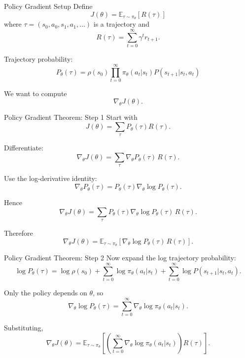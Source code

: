 \documentclass[aspectratio=169]{beamer}
\begin{document}
\begin{frame}{Policy Gradient Setup}
  Define
  \[
  J(\theta)=\mathbb{E}_{\tau\sim \pi_\theta}[R(\tau)]
  \]
  where $\tau=(s_0,a_0,s_1,a_1,\dots)$ is a trajectory and
  \[
  R(\tau)=\sum_{t=0}^\infty \gamma^t r_{t+1}.
  \]

  Trajectory probability:
  \[
  P_\theta(\tau)=\rho(s_0)\prod_{t=0}^\infty \pi_\theta(a_t|s_t)P(s_{t+1}|s_t,a_t)
  \]

  We want to compute
  \[
  \nabla_\theta J(\theta).
  \]
\end{frame}

\begin{frame}{Policy Gradient Theorem: Step 1}
  Start with
  \[
  J(\theta)=\sum_\tau P_\theta(\tau)R(\tau).
  \]

  Differentiate:
  \[
  \nabla_\theta J(\theta)=\sum_\tau \nabla_\theta P_\theta(\tau)\,R(\tau).
  \]

  Use the log-derivative identity:
  \[
  \nabla_\theta P_\theta(\tau)=P_\theta(\tau)\nabla_\theta \log P_\theta(\tau).
  \]

  Hence
  \[
  \nabla_\theta J(\theta)=\sum_\tau P_\theta(\tau)\nabla_\theta \log P_\theta(\tau)\,R(\tau).
  \]

  Therefore
  \[
  \nabla_\theta J(\theta)=\mathbb{E}_{\tau\sim \pi_\theta}\left[\nabla_\theta \log P_\theta(\tau)\,R(\tau)\right].
  \]
\end{frame}

\begin{frame}{Policy Gradient Theorem: Step 2}
  Now expand the log trajectory probability:
  \[
  \log P_\theta(\tau)=\log \rho(s_0)+
  \sum_{t=0}^\infty \log \pi_\theta(a_t|s_t)+
  \sum_{t=0}^\infty \log P(s_{t+1}|s_t,a_t).
  \]

  Only the policy depends on $\theta$, so
  \[
  \nabla_\theta \log P_\theta(\tau)=
  \sum_{t=0}^\infty \nabla_\theta \log \pi_\theta(a_t|s_t).
  \]

  Substituting,
  \[
  \nabla_\theta J(\theta)=
  \mathbb{E}_{\tau\sim \pi_\theta}
  \left[
    \left(
    \sum_{t=0}^\infty \nabla_\theta \log \pi_\theta(a_t|s_t)
    \right)
    R(\tau)
    \right].
  \]
\end{frame}
\end{document}

